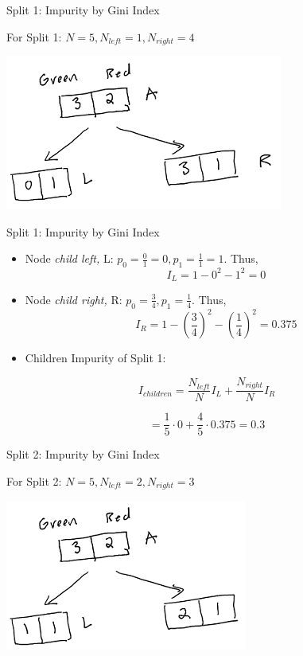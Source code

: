 \documentclass[
  ignorenonframetext,
]{beamer}
\begin{document}
\begin{frame}{Split 1: Impurity by Gini Index}
\protect\hypertarget{split-1-impurity-by-gini-index}{}

For Split 1: \(N = 5, N_{left} =1, N_{right} = 4\)

\includegraphics{images2/im1.png}

\end{frame}

\begin{frame}{Split 1: Impurity by Gini Index}
\protect\hypertarget{split-1-impurity-by-gini-index-1}{}

\begin{itemize}
\item
  Node \emph{child left,} L:
  \(p_0 = \frac{0}{1} = 0, p_1 = \frac{1}{1} = 1\). Thus,
  \[I_{L} = 1 -0^2-1^2 = 0\]
\item
  Node \emph{child right,} R: \(p_0 = \frac{3}{4}, p_1 = \frac{1}{4}\).
  Thus, \[I_{R} = 1-(\frac{3}{4})^2-(\frac{1}{4})^2 = 0.375\]
\item
  Children Impurity of Split 1:
\end{itemize}

\[
I_{children} =  \frac{N_{left}}{N}I_{L} + \frac{N_{right}}{N}I_{R}
\]

\[ = \frac{1}{5} \cdot 0 + \frac{4}{5} \cdot 0.375 = 0.3\]

\end{frame}

\begin{frame}{Split 2: Impurity by Gini Index}
\protect\hypertarget{split-2-impurity-by-gini-index}{}

For Split 2: \(N = 5, N_{left} =2, N_{right} = 3\)

\includegraphics{images2/im3.png}

\end{frame}
\end{document}
